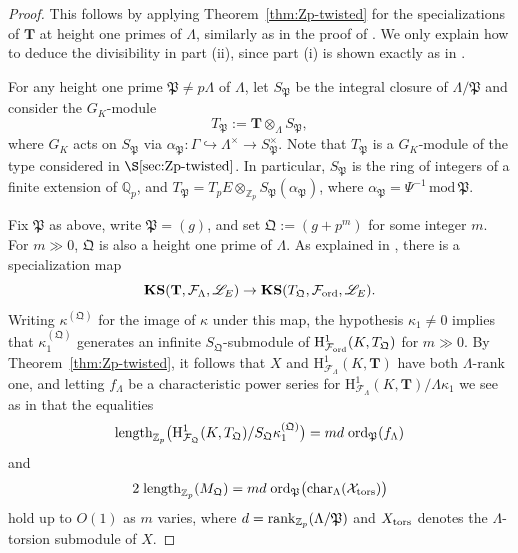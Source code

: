 \documentclass[10pt]{amsart}
\numberwithin{equation}{section}
\theoremstyle{definition}
\theoremstyle{remark}
\newcommand{\Z}{\mathbb{Z}}
\newcommand{\cL}{\mathscr{L}}
\newcommand{\Fcal}{\mathcal{F}}
\newcommand{\cF}{\mathcal{F}}
\newcommand{\bZ}{\mathbb{Z}}
\newcommand{\Q}{\mathbb{Q}}
\newcommand{\rH}{\mathrm{H}}
\begin{document}
\begin{proof} 
This follows by applying Theorem~\ref{thm:Zp-twisted} for the specializations of $\mathbf{T}$ at height one primes of $\Lambda$, similarly as in the proof of \cite[Thm.~2.2.10]{howard}. We only explain how to deduce the divisibility in part (ii), since part (i) is shown exactly as in \cite[Thm.~2.2.10]{howard}.

For any height one prime $\mathfrak{P}\neq p\Lambda$ of $\Lambda$, let $S_{\mathfrak{P}}$ be the integral closure of $\Lambda/\mathfrak{P}$ and consider the $G_K$-module
\[
T_\mathfrak{P}:=\mathbf{T}\otimes_\Lambda S_{\mathfrak{P}},
\]
where $G_K$ acts on $S_\mathfrak{P}$ via $\alpha_\mathfrak{P}:\Gamma\hookrightarrow\Lambda^\times\rightarrow S_\mathfrak{P}^\times$. Note that $T_\mathfrak{P}$ is a $G_K$-module of the type considered in $\S\ref{sec:Zp-twisted}$.
In particular, $S_\mathfrak{P}$ is the ring of integers of a finite extension of $\Q_p$, and 
$T_\mathfrak{P} = T_pE\otimes_{\Z_p}S_\mathfrak{P}(\alpha_\mathfrak{P})$, where 
$\alpha_\mathfrak{P} = \Psi^{-1} \,\mathrm{mod}\, \mathfrak{P}$.


Fix $\mathfrak{P}$ as above, write $\mathfrak{P}=(g)$, and set $\mathfrak{Q}:=(g+p^m)$ for some integer $m$.  
For $m\gg 0$, $\mathfrak{Q}$ is also a height one prime of $\Lambda$. As explained in \cite[p.~1463]{howard}, there is a specialization map 
\[
\mathbf{KS}(\mathbf{T},\Fcal_\Lambda,\cL_E)\rightarrow
\mathbf{KS}(T_{\mathfrak{Q}},\Fcal_{\rm ord},\cL_E).
\] 
Writing $\kappa^{(\mathfrak{Q})}$ for the image of $\kappa$ under this map, the hypothesis $\kappa_1\neq 0$ implies that $\kappa_1^{(\mathfrak{Q})}$ generates an infinite $S_{\mathfrak{Q}}$-submodule of $\rH^1_{\Fcal_{\rm ord}}(K,T_{\mathfrak{Q}})$ for $m\gg 0$. By Theorem~\ref{thm:Zp-twisted}, it follows that $X$ and $\rH^1_{\Fcal_\Lambda}(K,\mathbf{T})$ have both $\Lambda$-rank one, and letting $f_\Lambda$ be a characteristic power series for $\rH^1_{\Fcal_\Lambda}(K,\mathbf{T})/\Lambda\kappa_1$ we see as in \cite[p.~1463]{howard} that the equalities
\[
{\rm length}_{\bZ_p}\bigl(\rH^1_{\cF_{\mathfrak{Q}}}(K,T_{\mathfrak{Q}})/S_{\mathfrak{Q}}\kappa_1^{(\mathfrak{Q})}\bigr)=md\;{\rm ord}_{\mathfrak{P}}(f_\Lambda)
\]
and
\[
2\;{\rm length}_{\bZ_p}(M_{\mathfrak{Q}})=md\;{\rm ord}_{\mathfrak{P}}\bigl({\rm char}_\Lambda(\mathcal{X}_{\rm tors})\bigr)
\]
hold up to $O(1)$ as $m$ varies, where $d={\rm rank}_{\Z_p}(\Lambda/\mathfrak{P})$ and  $X_{\rm tors}$ denotes the $\Lambda$-torsion submodule of $X$. 


\end{proof}
\end{document}
